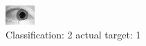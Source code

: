 \begin{figure}[h!]
\begin{center}
\includegraphics[width=0.60\columnwidth]{figures/ID1495_class_2_target_1.png}
\end{center}
\caption{ Classification: 2 actual target: 1}
\label{fig:ID1495_class_2_target_1}
\end{figure}
